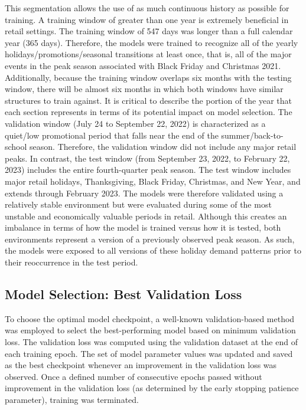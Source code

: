 This segmentation allows the use of as much continuous history as possible for training. A training window of greater than one year is extremely beneficial in retail settings. The training window of 547 days was longer than a full calendar year (365 days). Therefore, the models were trained to recognize all of the yearly holidays/promotions/seasonal transitions at least once, that is, all of the major events in the peak season associated with Black Friday and Christmas 2021. Additionally, because the training window overlaps six months with the testing window, there will be almost six months in which both windows have similar structures to train against. It is critical to describe the portion of the year that each section represents in terms of its potential impact on model selection. The validation window (July 24 to September 22, 2022) is characterized as a quiet/low promotional period that falls near the end of the summer/back-to-school season. Therefore, the validation window did not include any major retail peaks. In contrast, the test window (from September 23, 2022, to February 22, 2023) includes the entire fourth-quarter peak season. The test window includes major retail holidays, Thanksgiving, Black Friday, Christmas, and New Year, and extends through February 2023. The models were therefore validated using a relatively stable environment but were evaluated during some of the most unstable and economically valuable periods in retail. Although this creates an imbalance in terms of how the model is trained versus how it is tested, both environments represent a version of a previously observed peak season. As such, the models were exposed to all versions of these holiday demand patterns prior to their reoccurrence in the test period.

\subsection{Model Selection: Best Validation Loss}
\label{subsec:best_validation_loss}

To choose the optimal model checkpoint, a well-known validation-based method was employed to select the best-performing model based on minimum validation loss. The validation loss was computed using the validation dataset at the end of each training epoch. The set of model parameter values was updated and saved as the best checkpoint whenever an improvement in the validation loss was observed. Once a defined number of consecutive epochs passed without improvement in the validation loss (as determined by the early stopping patience parameter), training was terminated.

